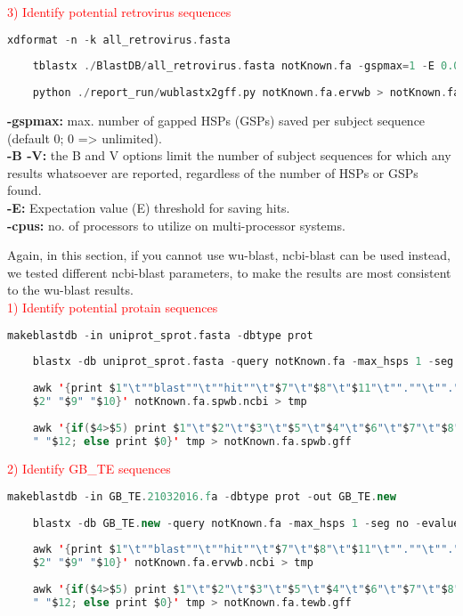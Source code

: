 \documentclass[a4paper,12pt]{article}
\begin{document}
	\noindent \textcolor{red}{3) Identify potential retrovirus sequences}
	\begin{lstlisting}[language=scala]
	xdformat -n -k all_retrovirus.fasta
	
	tblastx ./BlastDB/all_retrovirus.fasta notKnown.fa -gspmax=1 -E 0.00001 -B 1 -V 1 -cpus=32 > notKnown.fa.ervwb
	
	python ./report_run/wublastx2gff.py notKnown.fa.ervwb > notKnown.fa.ervwb.gff \end{lstlisting}
	
	\noindent \textbf{-gspmax:} max. number of gapped HSPs (GSPs) saved per subject sequence (default 0; 0 => unlimited). \\
	\textbf{-B -V:} the B and V options limit the number of subject sequences for which any results whatsoever are reported, regardless of the number of HSPs or GSPs found. \\
	\textbf{-E:} Expectation value (E) threshold for saving hits. \\
	\textbf{-cpus:} no. of processors to utilize on multi-processor systems. \\
	
	\pagebreak
	
	\noindent Again, in this section, if you cannot use wu-blast, ncbi-blast can be used instead, we tested different ncbi-blast parameters, to make the results are most consistent to the wu-blast results. \\
	
	\noindent \textcolor{red}{1) Identify potential protain sequences}
	\begin{lstlisting}[language=scala]
	makeblastdb -in uniprot_sprot.fasta -dbtype prot 
	
	blastx -db uniprot_sprot.fasta -query notKnown.fa -max_hsps 1 -seg no -evalue 0.00001 -num_threads 32 -max_target_seqs 1 -word_size 2 -outfmt 6 -out notKnown.fa.spwb.ncbi
	
	awk '{print $1"\t""blast""\t""hit""\t"$7"\t"$8"\t"$11"\t"".""\t"".""\t""Target sp|"
	$2" "$9" "$10}' notKnown.fa.spwb.ncbi > tmp
	
	awk '{if($4>$5) print $1"\t"$2"\t"$3"\t"$5"\t"$4"\t"$6"\t"$7"\t"$8"\t"$9" "$10" "$11
	" "$12; else print $0}' tmp > notKnown.fa.spwb.gff \end{lstlisting}
	
	\noindent \textcolor{red}{2) Identify GB\_TE sequences}
	\begin{lstlisting}[language=scala]
	makeblastdb -in GB_TE.21032016.fa -dbtype prot -out GB_TE.new
	
	blastx -db GB_TE.new -query notKnown.fa -max_hsps 1 -seg no -evalue 0.00001 -num_threads 32 -max_target_seqs 1 -word_size 2 -outfmt 6 -out notKnown.fa.tewb.ncbi
	
	awk '{print $1"\t""blast""\t""hit""\t"$7"\t"$8"\t"$11"\t"".""\t"".""\t""Target sp|"
	$2" "$9" "$10}' notKnown.fa.ervwb.ncbi > tmp
	
	awk '{if($4>$5) print $1"\t"$2"\t"$3"\t"$5"\t"$4"\t"$6"\t"$7"\t"$8"\t"$9" "$10" "$11
	" "$12; else print $0}' tmp > notKnown.fa.tewb.gff \end{lstlisting}
	
\end{document}
